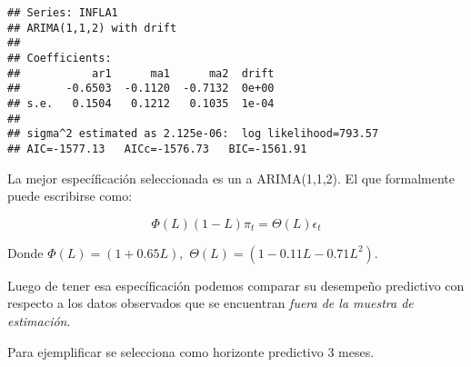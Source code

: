 \documentclass[
]{book}
\begin{document}
\begin{verbatim}
## Series: INFLA1 
## ARIMA(1,1,2) with drift 
## 
## Coefficients:
##           ar1      ma1      ma2  drift
##       -0.6503  -0.1120  -0.7132  0e+00
## s.e.   0.1504   0.1212   0.1035  1e-04
## 
## sigma^2 estimated as 2.125e-06:  log likelihood=793.57
## AIC=-1577.13   AICc=-1576.73   BIC=-1561.91
\end{verbatim}

La mejor específicación seleccionada es un a ARIMA(1,1,2). El que formalmente puede escribirse como:

\begin{equation} 
\Phi(L)(1-L)\pi_{t}=\Theta(L)\epsilon_{t}
\label{eq:3}
\end{equation}

Donde \(\Phi(L)=(1+0.65L),\) \(\Theta(L)=(1-0.11L-0.71L^{2})\).

Luego de tener esa específicación podemos comparar su desempeño predictivo con respecto a los datos observados que se encuentran \emph{fuera de la muestra de estimación}.

Para ejemplificar se selecciona como horizonte predictivo 3 meses.
\end{document}
